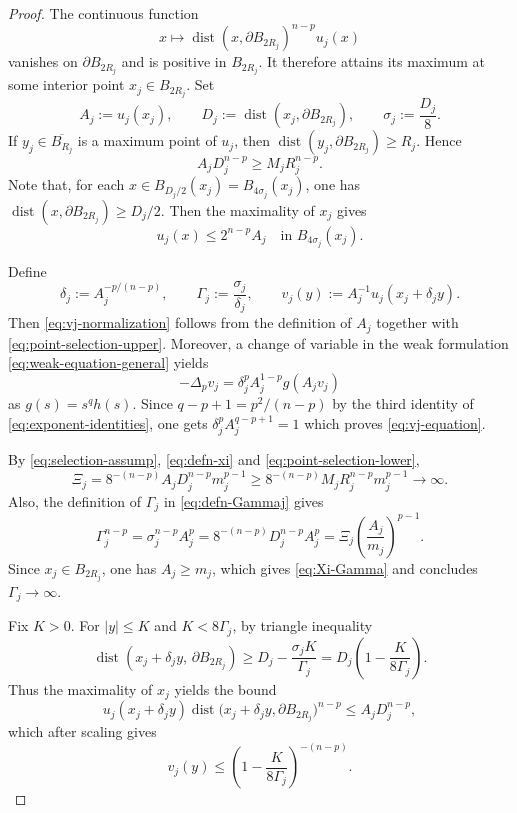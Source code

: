 \documentclass[reqno,12pt]{amsart}
\numberwithin{equation}{section}
\theoremstyle{remark}
\newcommand{\dist}{\operatorname{dist}}
\begin{document}
\begin{proof}
The continuous function 
$$
x\mapsto\dist(x,\partial B_{2R_j})^{n-p}u_j(x)
$$
vanishes on
$\partial B_{2R_j}$ and is positive in $B_{2R_j}$. It therefore attains its maximum at some interior point
$x_j\in B_{2R_j}$.
Set
$$
A_j:=u_j(x_j), \qquad
D_j:=\dist(x_j,\partial B_{2R_j}),
\qquad \sigma_j:=\frac{D_j}{8}.
$$
If $y_j\in\overline{B_{R_j}}$ is a maximum point of $u_j$, then $\dist(y_j,\partial B_{2R_j})\ge R_j$.  Hence
\begin{equation}\label{eq:point-selection-lower}
A_jD_j^{n-p}\ge M_jR_j^{n-p}.
\end{equation}
Note that, for each $x\in B_{D_j/2}(x_j)=B_{4\sigma_j}(x_j)$, one has
$\dist(x,\partial B_{2R_j})\ge D_j/2$.  Then the maximality of $x_j$ gives
\begin{equation}\label{eq:point-selection-upper}
u_j(x)\le2^{n-p}A_j \quad\text{in }B_{4\sigma_j}(x_j).
\end{equation}

Define
\begin{equation}\label{eq:defn-Gammaj}
\delta_j:= A_j^{-p/(n-p)},
\qquad \Gamma_j:= \frac{\sigma_j}{\delta_j},
\qquad v_j(y):= A_j^{-1} u_j(x_j+\delta_j y).
\end{equation}
Then \eqref{eq:vj-normalization} follows from the definition of $A_j$ together with \eqref{eq:point-selection-upper}.  Moreover, a change of variable in the weak formulation \eqref{eq:weak-equation-general} yields
$$
 -\Delta_p v_j =\delta_j^p A_j^{1-p} g(A_jv_j)
$$
as $g(s)=s^qh(s)$. 
Since $q-p+1=p^2/(n-p)$ by the third identity of \eqref{eq:exponent-identities}, one gets $\delta_j^p A_j^{q-p+1}=1$ which proves \eqref{eq:vj-equation}.

By \eqref{eq:selection-assump}, \eqref{eq:defn-xi} and \eqref{eq:point-selection-lower},
$$
 \Xi_j =8^{-(n-p)}A_jD_j^{n-p}m_j^{p-1}
 \ge  8^{-(n-p)}M_jR_j^{n-p}m_j^{p-1}\to\infty.
$$
Also, the definition of $\Gamma_j$ in \eqref{eq:defn-Gammaj} gives
$$
 \Gamma_j^{n-p}  =\sigma_j^{n-p}A_j^p
 = 8^{-(n-p)}D_j^{n-p} A_j^p =\Xi_j\left(\frac{A_j}{m_j}\right)^{p-1}.
$$
Since $x_j\in B_{2R_j}$, one has $A_j\ge m_j$, which gives \eqref{eq:Xi-Gamma} and concludes $\Gamma_j\to\infty$.

Fix $K>0$.  For $|y|\le K$ and $K<8\Gamma_j$, 
by triangle inequality
$$
 \dist(x_j+\delta_j y,\,\partial B_{2R_j})\ge D_j-\frac{\sigma_j K}{\Gamma_j} =  D_j\left(1-\frac{K}{8\Gamma_j}\right).
$$
Thus the maximality of $x_j$ yields the bound
$$u_j(x_j+\delta_j y) \operatorname{dist}
\bigl(x_j+\delta_j y,\partial B_{2R_j}\bigr)^{n-p} \le A_j D_j^{n-p},$$
which after scaling gives
\begin{equation}\label{eq:sharp-local-upper}
v_j(y)\le\left(1-\frac{K}{8\Gamma_j}\right)^{-(n-p)}.
\end{equation}


\end{proof}
\end{document}

